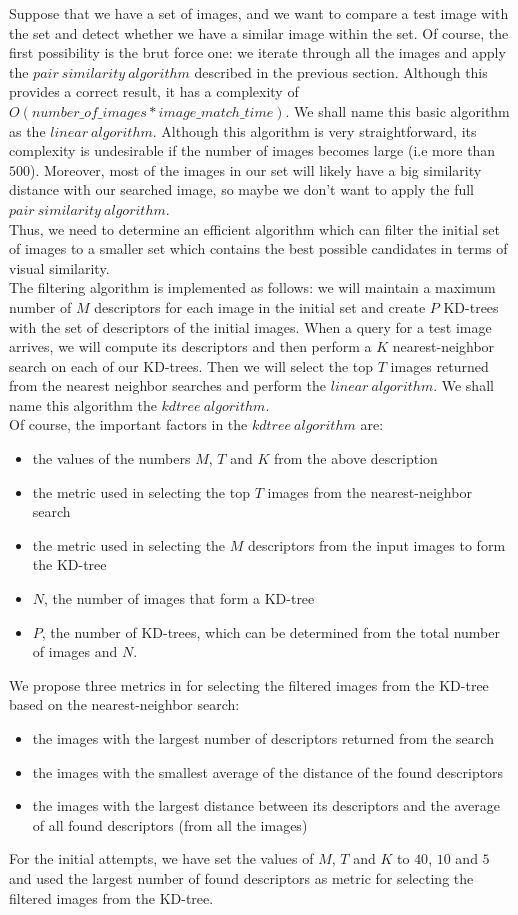 Suppose that we have a set of images, and we want to compare a test image with the set and detect whether we have a similar image within the set. Of course, the first possibility is the brut force one: we iterate through all the images and apply the $pair\ similarity\ algorithm$ described in the previous section.
Although this provides a correct result, it has a complexity of $O(number\_of\_images * image\_match\_time)$. We shall name this basic algorithm as the $linear\ algorithm$. Although this algorithm is very straightforward, its complexity is undesirable if the number of images becomes large (i.e more than $500$).
Moreover, most of the images in our set will likely have a big similarity distance with our searched image, so maybe we don't want to apply the full $pair\ similarity\ algorithm$.\\
Thus, we need to determine an efficient algorithm which can filter the initial set of images to a smaller set which contains the best possible candidates in terms of visual similarity.\\
The filtering algorithm is implemented as follows: we will maintain a maximum number of $M$ descriptors for each image in the initial set and create $P$ KD-trees with the set of descriptors of the initial images.
When a query for a test image arrives, we will compute its descriptors and then perform a $K$ nearest-neighbor search on each of our KD-trees. Then we will select the top $T$ images returned from the nearest neighbor searches and perform the $linear\ algorithm$. We shall name this algorithm the $kdtree\ algorithm$.\\
Of course, the important factors in the $kdtree\ algorithm$ are:
\begin{itemize}
	\item the values of the numbers $M$, $T$ and $K$ from the above description
	\item the metric used in selecting the top $T$ images from the nearest-neighbor search
	\item the metric used in selecting the $M$ descriptors from the input images to form the KD-tree
	\item $N$, the number of images that form a KD-tree
	\item $P$, the number of KD-trees, which can be determined from the total number of images and $N$.
\end{itemize}

We propose three metrics in for selecting the filtered images from the KD-tree based on the nearest-neighbor search:
\begin{itemize}
	\item the images with the largest number of descriptors returned from the search
	\item the images with the smallest average of the distance of the found descriptors
	\item the images with the largest distance between its descriptors and the average of all found descriptors (from all the images)
\end{itemize}
 
For the initial attempts, we have set the values of $M$, $T$ and $K$ to $40$, $10$ and $5$ and used the largest number of found descriptors as metric for selecting the filtered images from the KD-tree.\\
